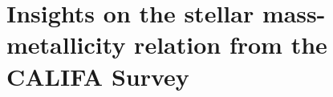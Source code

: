 


\chapter{Insights on the stellar mass-metallicity relation from the CALIFA Survey}
\label{apendice:1}




